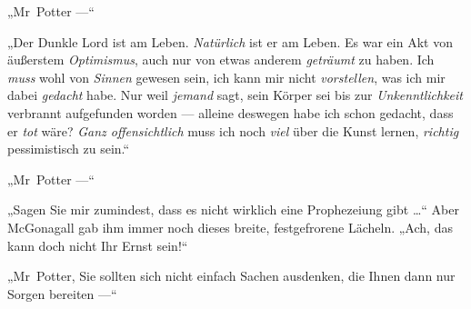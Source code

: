 „Mr~Potter —“

„Der Dunkle Lord ist am Leben. \emph{Natürlich} ist er am Leben. Es war ein Akt von äußerstem \emph{Optimismus}, auch nur von etwas anderem \emph{geträumt} zu haben. Ich \emph{muss} wohl von \emph{Sinnen} gewesen sein, ich kann mir nicht \emph{vorstellen}, was ich mir dabei \emph{gedacht} habe. Nur weil \emph{jemand} sagt, sein Körper sei bis zur \emph{Unkenntlichkeit} verbrannt aufgefunden worden — alleine deswegen habe ich schon gedacht, dass er \emph{tot} wäre? \emph{Ganz offensichtlich} muss ich noch \emph{viel} über die Kunst lernen, \emph{richtig} pessimistisch zu sein.“

„Mr~Potter —“

„Sagen Sie mir zumindest, dass es nicht wirklich eine Prophezeiung gibt …“ Aber McGonagall gab ihm immer noch dieses breite, festgefrorene Lächeln.
„Ach, das kann doch nicht Ihr Ernst sein!“

„Mr~Potter, Sie sollten sich nicht einfach Sachen ausdenken, die Ihnen dann nur Sorgen bereiten —“

